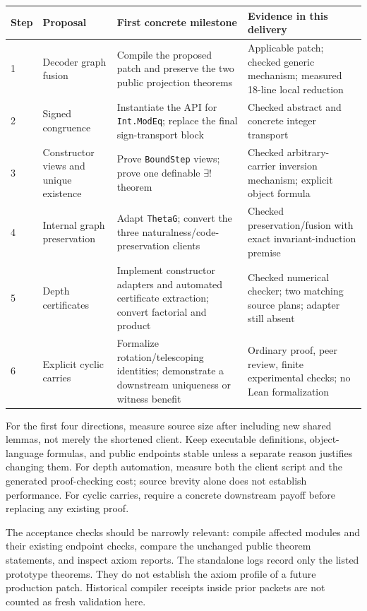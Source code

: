 \documentclass[11pt]{article}
\theoremstyle{remark}\newtheorem{remark}[theorem]{Remark}
\newcommand{\code}[1]{\nolinkurl{#1}}
\begin{document}
\begin{longtable}{@{}P{9mm}P{39mm}P{47mm}P{52mm}@{}}
\toprule
Step & Proposal & First concrete milestone & Evidence in this delivery\\
\midrule{} & Decoder graph fusion & Compile the proposed patch and preserve the two public projection theorems & Applicable patch; checked generic mechanism; measured 18-line local reduction\\
2 & Signed congruence & Instantiate the API for \code{Int.ModEq}; replace the final sign-transport block & Checked abstract and concrete integer transport\\
3 & Constructor views and unique existence & Prove \code{BoundStep} views; prove one definable \(\exists!\) theorem & Checked arbitrary-carrier inversion mechanism; explicit object formula\\
4 & Internal graph preservation & Adapt \code{ThetaG}; convert the three naturalness/code-preservation clients & Checked preservation/fusion with exact invariant-induction premise\\
5 & Depth certificates & Implement constructor adapters and automated certificate extraction; convert factorial and product & Checked numerical checker; two matching source plans; adapter still absent\\
6 & Explicit cyclic carries & Formalize rotation/telescoping identities; demonstrate a downstream uniqueness or witness benefit & Ordinary proof, peer review, finite experimental checks; no Lean formalization\\
\bottomrule
\end{longtable}

For the first four directions, measure source size after including new shared lemmas, not merely the shortened client. Keep executable definitions, object-language formulas, and public endpoints stable unless a separate reason justifies changing them. For depth automation, measure both the client script and the generated proof-checking cost; source brevity alone does not establish performance. For cyclic carries, require a concrete downstream payoff before replacing any existing proof.

The acceptance checks should be narrowly relevant: compile affected modules and their existing endpoint checks, compare the unchanged public theorem statements, and inspect axiom reports. The standalone logs record only the listed prototype theorems. They do not establish the axiom profile of a future production patch. Historical compiler receipts inside prior packets are not counted as fresh validation here.
\end{document}
